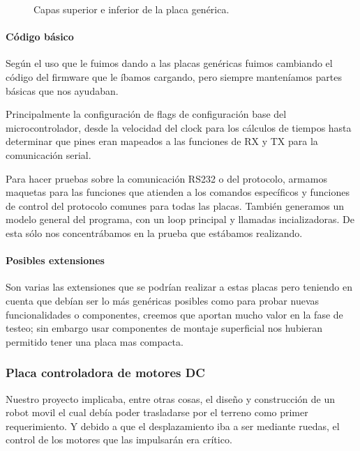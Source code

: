 \begin{figure}
	\caption{Capas superior e inferior de la placa gen\'erica.}
	\label{hF_placa_gen_capas}
\end{figure}

\paragraph{C\'odigo b\'asico}
\label{h_placas_generica_codigo}

Seg\'un el uso que le fuimos dando a las placas gen\'ericas fuimos cambiando el c\'odigo del firmware que le
\'ibamos cargando, pero siempre manten\'iamos partes b\'asicas que nos ayudaban.

Principalmente la configuraci\'on de flags de configuraci\'on base del microcontrolador, desde la velocidad
del clock para los c\'alculos de tiempos hasta determinar que pines eran mapeados a las funciones de RX y TX
para la comunicaci\'on serial.

Para hacer pruebas sobre la comunicaci\'on RS232 o del protocolo, armamos maquetas para las funciones que
atienden a los comandos espec\'ificos y funciones de control del protocolo comunes para todas las placas.
Tambi\'en generamos un modelo general del programa, con un loop principal y llamadas incializadoras.
De esta s\'olo nos concentr\'abamos en la prueba que est\'abamos realizando.

\paragraph{Posibles extensiones}
\label{h_placas_generica_extensiones}

Son varias las extensiones que se podr\'ian realizar a estas placas pero teniendo en cuenta que deb\'ian ser
lo m\'as gen\'ericas posibles como para probar nuevas funcionalidades o componentes, creemos que aportan mucho
valor en la fase de testeo; sin embargo usar componentes de montaje superficial nos hubieran permitido tener
una placa mas compacta.

\subsubsection{Placa controladora de motores DC}
\label{h_placas_motorDC}

Nuestro proyecto implicaba, entre otras cosas, el dise\~no y construcci\'on de un robot movil el cual deb\'ia poder
trasladarse por el terreno como primer requerimiento.
Y debido a que el desplazamiento iba a ser mediante ruedas, el control de los motores que las impulsar\'an era cr\'itico.


